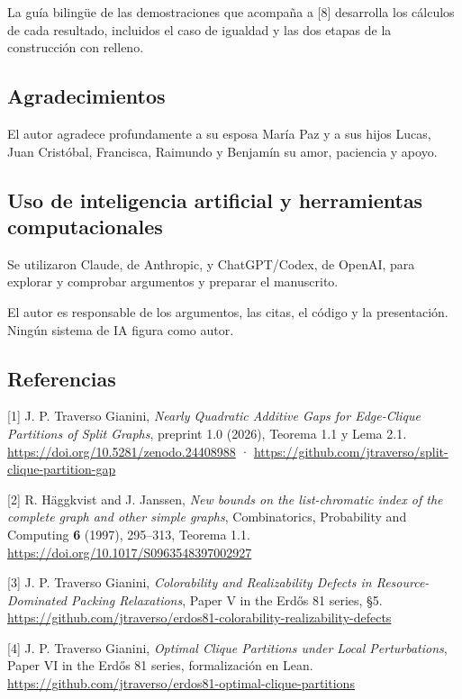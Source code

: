 \documentclass[spanish,11pt,a4paper]{article}
\begin{document}
La guía bilingüe de las demostraciones que acompaña a {[}8{]} desarrolla los cálculos de cada resultado, incluidos el caso de igualdad y las dos etapas de la construcción con relleno.

\subsection{Agradecimientos}\label{agradecimientos}

El autor agradece profundamente a su esposa María Paz y a sus hijos Lucas, Juan Cristóbal, Francisca, Raimundo y Benjamín su amor, paciencia y apoyo.

\subsection{Uso de inteligencia artificial y herramientas computacionales}\label{uso-de-inteligencia-artificial-y-herramientas-computacionales}

Se utilizaron Claude, de Anthropic, y ChatGPT/Codex, de OpenAI, para explorar y comprobar argumentos y preparar el manuscrito.

El autor es responsable de los argumentos, las citas, el código y la presentación. Ningún sistema de IA figura como autor.

\subsection{Referencias}\label{referencias}

{[}1{]} J. P. Traverso Gianini, \emph{Nearly Quadratic Additive Gaps for Edge-Clique Partitions of Split Graphs}, preprint 1.0 (2026), Teorema 1.1 y Lema 2.1. \url{https://doi.org/10.5281/zenodo.24408988} · \url{https://github.com/jtraverso/split-clique-partition-gap}

{[}2{]} R. Häggkvist and J. Janssen, \emph{New bounds on the list-chromatic index of the complete graph and other simple graphs}, Combinatorics, Probability and Computing \textbf{6} (1997), 295--313, Teorema 1.1. \url{https://doi.org/10.1017/S0963548397002927}

{[}3{]} J. P. Traverso Gianini, \emph{Colorability and Realizability Defects in Resource-Dominated Packing Relaxations}, Paper V in the Erdős 81 series, §5. \url{https://github.com/jtraverso/erdos81-colorability-realizability-defects}

{[}4{]} J. P. Traverso Gianini, \emph{Optimal Clique Partitions under Local Perturbations}, Paper VI in the Erdős 81 series, formalización en Lean. \url{https://github.com/jtraverso/erdos81-optimal-clique-partitions}
\end{document}
